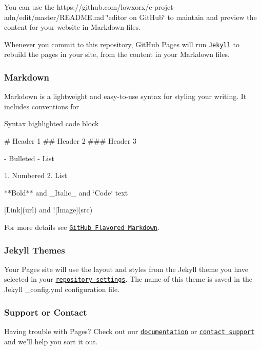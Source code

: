 You can use the https\+://github.com/lowxorx/c-\/projet-\/adn/edit/master/\+R\+E\+A\+D\+M\+E.\+md \char`\"{}editor on Git\+Hub\char`\"{} to maintain and preview the content for your website in Markdown files.

Whenever you commit to this repository, Git\+Hub Pages will run \href{https://jekyllrb.com/}{\tt Jekyll} to rebuild the pages in your site, from the content in your Markdown files.

\subsubsection*{Markdown}

Markdown is a lightweight and easy-\/to-\/use syntax for styling your writing. It includes conventions for


\begin{DoxyCode}
Syntax highlighted code block

# Header 1
## Header 2
### Header 3

- Bulleted
- List

1. Numbered
2. List

**Bold** and \_Italic\_ and `Code` text

[Link](url) and ![Image](src)
\end{DoxyCode}


For more details see \href{https://guides.github.com/features/mastering-markdown/}{\tt Git\+Hub Flavored Markdown}.

\subsubsection*{Jekyll Themes}

Your Pages site will use the layout and styles from the Jekyll theme you have selected in your \href{https://github.com/lowxorx/c-projet-adn/settings}{\tt repository settings}. The name of this theme is saved in the Jekyll {\ttfamily \+\_\+config.\+yml} configuration file.

\subsubsection*{Support or Contact}

Having trouble with Pages? Check out our \href{https://help.github.com/categories/github-pages-basics/}{\tt documentation} or \href{https://github.com/contact}{\tt contact support} and we’ll help you sort it out. 